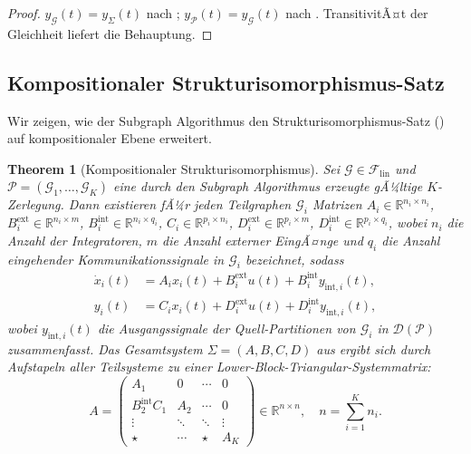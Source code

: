 ﻿\documentclass[12pt,a4paper]{article}
\newtheorem{theorem}{Theorem}[section]
\theoremstyle{definition}
\begin{document}
\begin{proof}
$y_{\mathcal{G}}(t) = y_{\Sigma}(t)$ nach ;
$y_{\mathcal{P}}(t) = y_{\mathcal{G}}(t)$ nach .
TransitivitÃ¤t der Gleichheit liefert die Behauptung.
\end{proof}

\subsection{Kompositionaler Strukturisomorphismus-Satz}
\label{subsec:subgraph-iso}

Wir zeigen, wie der Subgraph Algorithmus den Strukturisomorphismus-Satz
() auf kompositionaler Ebene erweitert.

\begin{theorem}[Kompositionaler Strukturisomorphismus]
\label{thm:comp-iso}
Sei $\mathcal{G} \in \mathcal{F}_{\mathrm{lin}}$ und
$\mathcal{P} = (\mathcal{G}_1, \ldots, \mathcal{G}_K)$ eine durch den
Subgraph Algorithmus erzeugte gÃ¼ltige $K$-Zerlegung. Dann existieren fÃ¼r
jeden Teilgraphen $\mathcal{G}_i$ Matrizen
$A_i \in \mathbb{R}^{n_i \times n_i}$,
$B_i^{\mathrm{ext}} \in \mathbb{R}^{n_i \times m}$,
$B_i^{\mathrm{int}} \in \mathbb{R}^{n_i \times q_i}$,
$C_i \in \mathbb{R}^{p_i \times n_i}$,
$D_i^{\mathrm{ext}} \in \mathbb{R}^{p_i \times m}$,
$D_i^{\mathrm{int}} \in \mathbb{R}^{p_i \times q_i}$,
wobei $n_i$ die Anzahl der Integratoren, $m$ die Anzahl externer EingÃ¤nge
und $q_i$ die Anzahl eingehender Kommunikationssignale in $\mathcal{G}_i$
bezeichnet, sodass
\begin{align}
  \dot{x}_i(t) &= A_i x_i(t) + B_i^{\mathrm{ext}} u(t)
                  + B_i^{\mathrm{int}} y_{\mathrm{int},i}(t), \label{eq:comp-state}\\
  y_i(t)       &= C_i x_i(t) + D_i^{\mathrm{ext}} u(t)
                  + D_i^{\mathrm{int}} y_{\mathrm{int},i}(t), \label{eq:comp-out}
\end{align}
wobei $y_{\mathrm{int},i}(t)$ die Ausgangssignale der Quell-Partitionen
von $\mathcal{G}_i$ in $\mathcal{D}(\mathcal{P})$ zusammenfasst.
Das Gesamtsystem $\Sigma = (A, B, C, D)$ aus  ergibt sich
durch Aufstapeln aller Teilsysteme zu einer Lower-Block-Triangular-Systemmatrix:
\[
  A = \begin{pmatrix}
    A_1             & 0      & \cdots & 0 \\
    B_2^{\mathrm{int}} C_1 & A_2    & \cdots & 0 \\
    \vdots          & \ddots & \ddots & \vdots \\
    \star           & \cdots & \star  & A_K
  \end{pmatrix} \in \mathbb{R}^{n \times n}, \quad n = \sum_{i=1}^K n_i.
\]
\end{theorem}
\end{document}
